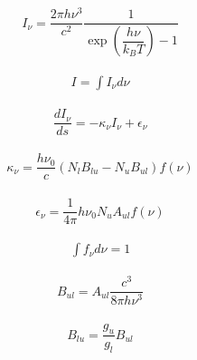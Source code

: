 \begin{align}
	I_\nu = \dfrac{2 \pi h \nu^3}{c^2} \dfrac{1}{\exp\left(\dfrac{h \nu}{k_B T}\right) - 1}
\end{align}

\begin{align}
	I = \int I_{\nu} d\nu
\end{align}

\begin{align}
	\dfrac{d I_{\nu}}{ds} = - \kappa_\nu I_{\nu} + 	\epsilon_\nu
\end{align}

\begin{align}
	\kappa_\nu = \dfrac{h \nu_0}{c} \left(N_l B_{lu} - N_u B_{ul}\right) f(\nu)
\end{align}

\begin{align}
	\epsilon_\nu = \dfrac{1}{4 \pi} h \nu_0 N_u A_{ul}  f(\nu)
\end{align}

\begin{align}
	\int f_{\nu} d\nu = 1
\end{align}

\begin{align}
	B_{ul} = A_{ul} \dfrac{c^3}{8 \pi h \nu^3}
\end{align}

\begin{align}
	B_{lu} = \dfrac{g_u}{g_l} B_{ul}
\end{align}
